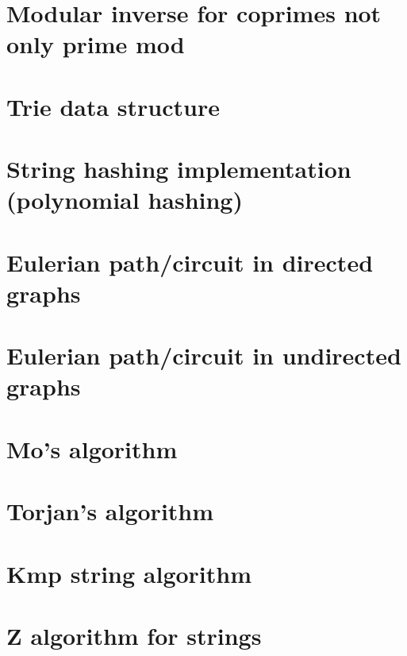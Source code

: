 \section{Modular inverse for coprimes not only prime mod}
\raggedbottom

\section{Trie data structure}
\raggedbottom

\section{String hashing implementation (polynomial hashing)}
\raggedbottom

\section{Eulerian path/circuit in directed graphs}
\raggedbottom

\section{Eulerian path/circuit in undirected graphs}
\raggedbottom

\section{Mo's algorithm}
\raggedbottom

\section{Torjan's algorithm}
\raggedbottom

\section{Kmp string algorithm}
\raggedbottom

\section{Z algorithm for strings}
\raggedbottom

